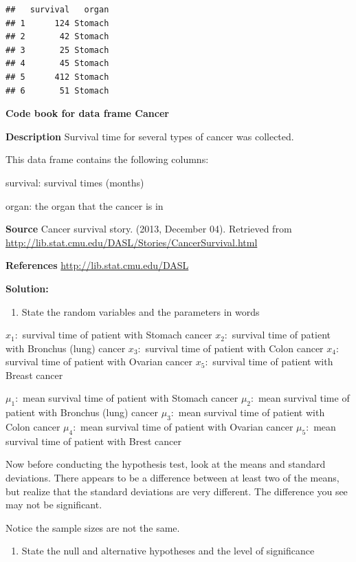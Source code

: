 \documentclass[
]{book}
\providecommand{\tightlist}{%
  \setlength{\itemsep}{0pt}\setlength{\parskip}{0pt}}
\begin{document}
\begin{verbatim}
##   survival   organ
## 1      124 Stomach
## 2       42 Stomach
## 3       25 Stomach
## 4       45 Stomach
## 5      412 Stomach
## 6       51 Stomach
\end{verbatim}

\textbf{Code book for data frame Cancer}

\textbf{Description}
Survival time for several types of cancer was collected.

This data frame contains the following columns:

survival: survival times (months)

organ: the organ that the cancer is in

\textbf{Source}
Cancer survival story. (2013, December 04). Retrieved from
\url{http://lib.stat.cmu.edu/DASL/Stories/CancerSurvival.html}

\textbf{References}
\url{http://lib.stat.cmu.edu/DASL}

\textbf{Solution:}

\begin{enumerate}
\def\labelenumi{\arabic{enumi}.}
\tightlist
\item
  State the random variables and the parameters in words
\end{enumerate}

\(x_1:\) survival time of patient with Stomach cancer
\(x_2:\) survival time of patient with Bronchus (lung) cancer
\(x_3:\) survival time of patient with Colon cancer
\(x_4:\) survival time of patient with Ovarian cancer
\(x_5:\) survival time of patient with Breast cancer

\(\mu_1:\) mean survival time of patient with Stomach cancer
\(\mu_2:\) mean survival time of patient with Bronchus (lung) cancer
\(\mu_3:\) mean survival time of patient with Colon cancer
\(\mu_4:\) mean survival time of patient with Ovarian cancer
\(\mu_5:\) mean survival time of patient with Brest cancer

Now before conducting the hypothesis test, look at the means and standard deviations. There appears to be a difference between at least two of the means, but realize that the standard deviations are very different. The difference you see may not be significant.

Notice the sample sizes are not the same.

\begin{enumerate}
\def\labelenumi{\arabic{enumi}.}
\setcounter{enumi}{1}
\tightlist
\item
  State the null and alternative hypotheses and the level of significance
\end{enumerate}
\end{document}
